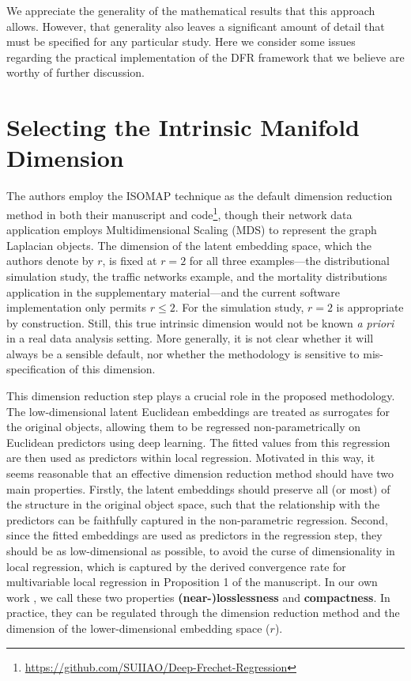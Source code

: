 We appreciate the generality of the mathematical results that this approach allows. However, that generality also leaves a significant amount of detail that must be specified for any particular study.
Here we consider some issues regarding the practical implementation of the DFR framework that we believe are worthy of further discussion.

\section{Selecting the Intrinsic Manifold Dimension}

The authors employ the ISOMAP technique as the default dimension reduction method in both their manuscript and code\footnote{\href{https://github.com/SUIIAO/Deep-Frechet-Regression}{https://github.com/SUIIAO/Deep-Frechet-Regression}}, though their network data application employs Multidimensional Scaling (MDS) to represent the graph Laplacian objects.
The dimension of the latent embedding space, which the authors denote by $r$, is fixed at $r=2$ for all three examples---the distributional simulation study, the traffic networks example, and the mortality distributions application in the supplementary material---and the current software implementation only permits $r\leq2$.
For the simulation study, $r=2$ is appropriate by construction.
Still, this true intrinsic dimension would not be known \emph{a priori} in a real data analysis setting.
More generally, it is not clear whether it will always be a sensible default, nor whether the methodology is sensitive to mis-specification of this dimension.

This dimension reduction step plays a crucial role in the proposed methodology.
The low-dimensional latent Euclidean embeddings are treated as surrogates for the original objects, allowing them to be regressed non-parametrically on Euclidean predictors using deep learning.
The fitted values from this regression are then used as predictors within local \Frechet regression.
Motivated in this way, it seems reasonable that an effective dimension reduction method should have two main properties.
Firstly, the latent embeddings should preserve all (or most) of the structure in the original object space, such that the relationship with the predictors can be faithfully captured in the non-parametric regression.
Second, since the fitted embeddings are used as predictors in the \Frechet regression step, they should be as low-dimensional as possible, to avoid the curse of dimensionality in local regression, which is captured by the derived convergence rate for multivariable local \Frechet regression in Proposition 1 of the manuscript.
In our own work \parencite[Compact near-Lossless Latent Representations (CLaRe);][]{zohner_clare_2025}, we call these two properties \textbf{(near-)losslessness} and \textbf{compactness}.
In practice, they can be regulated through the dimension reduction method and the dimension of the lower-dimensional embedding space ($r$).

